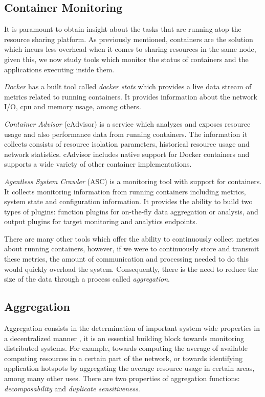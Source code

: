 \subsection{Container Monitoring}

It is paramount to obtain insight about the tasks that are running atop the resource sharing platform. As previously mentioned, containers are the solution which incurs less overhead when it comes to sharing resources in the same node, given this, we now study tools which monitor the status of containers and the applications executing inside them. 

\textit{Docker} \cite{docker} has a built tool called \textit{docker stats} \cite{docker_stats} which provides a live data stream of metrics related to running containers. It provides information about the network I/O, cpu and memory usage, among others. 

\textit{Container Advisor} \cite{cAdvisor} (cAdvisor) is a service which analyzes and exposes resource usage and also performance data from running containers. The information it collects consists of resource isolation parameters, historical resource usage and network statistics. cAdvisor includes native support for Docker containers and supports a wide variety of other container implementations.

\textit{Agentless System Crawler}  (ASC) \cite{cloudviz_2019} is a monitoring tool with support for containers. It collects monitoring information from running containers including metrics, system state and configuration information. It provides the ability to build two types of plugins: function  plugins for on-the-fly data aggregation or analysis, and output plugins for target monitoring and analytics endpoints.

There are many other tools which offer the ability to continuously collect metrics about running containers, however, if we were to continuously store and transmit these metrics, the amount of communication and processing needed to do this would quickly overload the system. Consequently, there is the need to reduce the size of the data through a process called \textit{aggregation}.

\subsection{Aggregation}

Aggregation consists in the determination of important system wide properties in a decentralized manner \cite{DBLP:journals/corr/abs-1110-0725}, it is an essential building block towards monitoring distributed systems. For example, towards computing the average of available computing resources in a certain part of the network, or towards identifying application hotspots by aggregating the average resource usage in certain areas, among many other uses. There are two properties of aggregation functions: \textit{decomposability} and \textit{duplicate sensitiveness}.

